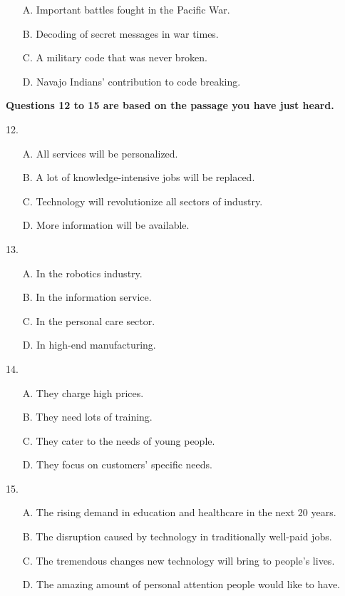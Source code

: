 \documentclass[UTF8,11pt]{ctexart}
\begin{document}
\begin{itemize}[leftmargin=2em,itemsep=.2em,topsep=.4em]\item[A.] Important battles fought in the Pacific War.
\item[B.] Decoding of secret messages in war times.
\item[C.] A military code that was never broken.
\item[D.] Navajo Indians’ contribution to code breaking.
\end{itemize}

\textbf{Questions 12 to 15 are based on the passage you have just heard.}


12.


\begin{itemize}[leftmargin=2em,itemsep=.2em,topsep=.4em]\item[A.] All services will be personalized.
\item[B.] A lot of knowledge-intensive jobs will be replaced.
\item[C.] Technology will revolutionize all sectors of industry.
\item[D.] More information will be available.
\end{itemize}

13.


\begin{itemize}[leftmargin=2em,itemsep=.2em,topsep=.4em]\item[A.] In the robotics industry.
\item[B.] In the information service.
\item[C.] In the personal care sector.
\item[D.] In high-end manufacturing.
\end{itemize}

14.


\begin{itemize}[leftmargin=2em,itemsep=.2em,topsep=.4em]\item[A.] They charge high prices.
\item[B.] They need lots of training.
\item[C.] They cater to the needs of young people.
\item[D.] They focus on customers’ specific needs.
\end{itemize}

15.


\begin{itemize}[leftmargin=2em,itemsep=.2em,topsep=.4em]\item[A.] The rising demand in education and healthcare in the next 20 years.
\item[B.] The disruption caused by technology in traditionally well-paid jobs.
\item[C.] The tremendous changes new technology will bring to people’s lives.
\item[D.] The amazing amount of personal attention people would like to have.
\end{itemize}
\end{document}

